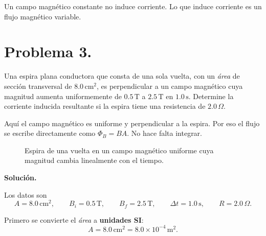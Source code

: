 \documentclass[11pt]{article}
\newcommand{\soluciontitulo}{%
  \par\medskip
  \noindent\textbf{Solución.}\par
  \smallskip
}
\newcommand{\Bentra}[2]{%
    \draw[fieldblue,line width=0.55pt] (#1,#2) circle (0.11);
    \draw[fieldblue,line width=0.55pt] ($(#1,#2)+(-0.065,-0.065)$)--($(#1,#2)+(0.065,0.065)$);
    \draw[fieldblue,line width=0.55pt] ($(#1,#2)+(-0.065,0.065)$)--($(#1,#2)+(0.065,-0.065)$);
}
\begin{document}
Un campo magn\'etico constante no induce corriente. Lo que induce corriente es un flujo magn\'etico variable.


\clearpage

\section*{Problema 3.}
Una espira plana conductora que consta de una sola vuelta, con un \textit{\'area} de secci\'on transversal de $8.0\,\mathrm{cm^2}$, es perpendicular a un campo magn\'etico cuya magnitud aumenta uniformemente de $0.5\,\mathrm{T}$ a $2.5\,\mathrm{T}$ en $1.0\,\mathrm{s}$. Determine la corriente inducida resultante si la espira tiene una resistencia de $2.0\,\Omega$.


Aqu\'i el campo magn\'etico es uniforme y perpendicular a la espira. Por eso el flujo se escribe directamente como $\Phi_B=BA$. No hace falta integrar.


\begin{figure}[H]
\centering
{}
\caption{Espira de una vuelta en un campo magn\'etico uniforme cuya magnitud cambia linealmente con el tiempo.}
\label{fig:p3_uniforme}
\end{figure}

\soluciontitulo

Los datos son
\begin{equation*}
    A=8.0\,\mathrm{cm^2},\qquad
    B_i=0.5\,\mathrm{T},\qquad
    B_f=2.5\,\mathrm{T},\qquad
    \Delta t=1.0\,\mathrm{s},\qquad
    R=2.0\,\Omega.
\end{equation*}

Primero se convierte el \textit{\'area} a \textbf{unidades SI}:
\begin{equation*}
    A=8.0\,\mathrm{cm^2}=8.0\times10^{-4}\,\mathrm{m^2}.
\end{equation*}
\end{document}
